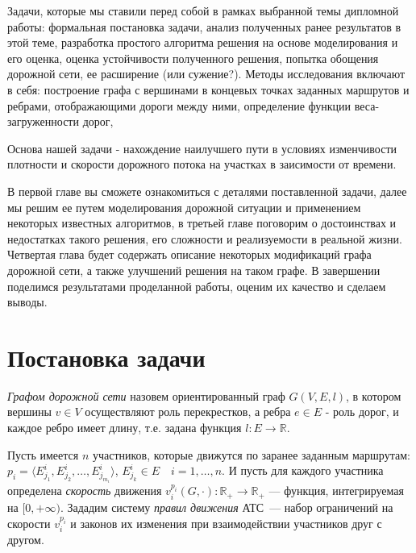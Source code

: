 \documentclass[12pt, a4paper]{article}
\begin{document}
Задачи, которые мы ставили перед собой в рамках выбранной темы дипломной работы: формальная постановка задачи, анализ полученных ранее результатов в этой теме, разработка простого алгоритма решения на основе моделирования и его оценка, оценка устойчивости полученного решения, попытка обощения дорожной сети, ее расширение (или сужение?). Методы исследования включают в себя: построение графа с вершинами в концевых точках заданных маршрутов и ребрами, отображающими дороги между ними, определение функции веса-загруженности дорог, 



Основа нашей задачи - нахождение наилучшего пути в условиях изменчивости плотности и скорости дорожного потока на участках в заисимости от времени.

В первой главе вы сможете ознакомиться с деталями поставленной задачи, далее мы решим ее путем моделирования дорожной ситуации и применением некоторых известных алгоритмов, в третьей главе поговорим о достоинствах и недостатках такого решения, его сложности и реализуемости в реальной жизни. Четвертая глава будет содержать описание некоторых модификаций графа дорожной сети, а также улучшений решения на таком графе. В завершении поделимся результатами проделанной работы, оценим их качество и сделаем выводы.




\newpage
\section{Постановка задачи}
 \textit{Графом дорожной сети} назовем ориентированный граф $ G (V, E, l)$, в котором вершины $ v \in V$ осуществляют роль перекрестков, а ребра $e \in E$ - роль дорог, и каждое ребро имеет длину, т.е. задана функция $l : E \rightarrow \mathbb {R} $.

Пусть имеется $n$ участников, которые движутся по заранее заданным маршрутам:  $ p_i = \langle E^i_{j_1}, E^i_{j_2}, \dots, E^i_{j_{m_i}} \rangle$, $ E^i_{j_k} \in E \quad i = 1, \dots, n$. И пусть для каждого участника определена \textit{скорость} движения $v^{p_i}_i(G, \cdot) : \mathbb{R}_+ \rightarrow \mathbb{R}_+$ --- функция, интегрируемая на $[0, + \infty)$. Зададим систему \textit{правил движения} АТС~--- набор ограничений на скорости $v^{p_i}_i$ и законов их изменения при взаимодействии участников друг с другом.
\end{document}
